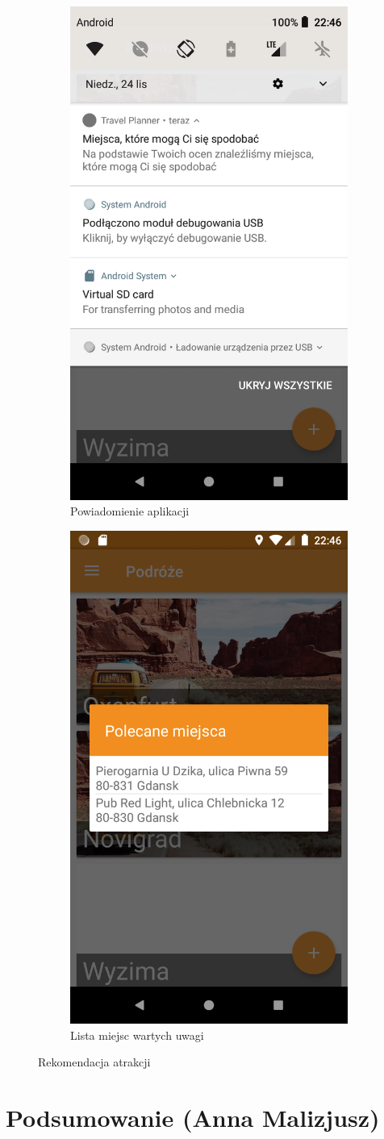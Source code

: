 \documentclass[10pt,twoside,a4paper]{report}
\begin{document}
\begin{figure}[h]
\centering
\begin{subfigure}{0.4\textwidth}
\centering
\includegraphics[width=0.9\linewidth, width=5cm]{recomendation1}
\caption{Powiadomienie aplikacji}
\label{fig:recomendation1}
\end{subfigure}
\begin{subfigure}{0.4\textwidth}
\centering
\includegraphics[width=0.9\linewidth, width=5cm]{recomendation2}
\caption{Lista miejsc wartych uwagi}
\label{fig:recomendation2}
\end{subfigure}
\caption{Rekomendacja atrakcji}
\label{fig:podrecznik11}
\end{figure}
\FloatBarrier

\chapter{Podsumowanie (Anna Malizjusz)}
\end{document}
